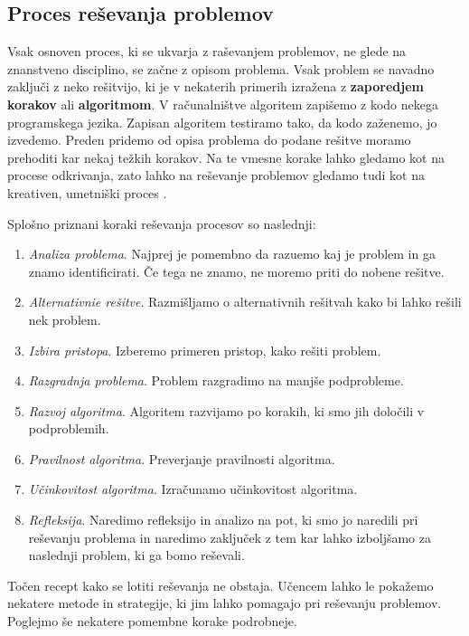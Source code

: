 \subsection{Proces reševanja problemov}
\label{sec:proces_reševanja_problemov}

Vsak osnoven proces, ki se ukvarja z raševanjem problemov, ne glede na
znanstveno disciplino, se začne z opisom problema. Vsak problem se
navadno zaključi z neko rešitvijo, ki je v nekaterih primerih izražena
z \textbf{zaporedjem korakov} ali \textbf{algoritmom}. V računalništve
algoritem zapišemo z kodo nekega programskega jezika. Zapisan
algoritem testiramo tako, da kodo zaženemo, jo izvedemo. Preden
pridemo od opisa problema do podane rešitve moramo prehoditi kar nekaj
težkih korakov. Na te vmesne korake lahko gledamo kot na procese
odkrivanja, zato lahko na reševanje problemov gledamo tudi kot na
kreativen, umetniški proces \cite{guideTCS}.

Splošno priznani koraki reševanja procesov so naslednji:

\begin{enumerate}
\tightlist
\item \emph{Analiza problema}. Najprej je pomembno da razuemo kaj je
  problem in ga znamo identificirati. Če tega ne znamo, ne moremo
  priti do nobene rešitve.
\item \emph{Alternativnie rešitve}. Razmišljamo o alternativnih
  rešitvah kako bi lahko rešili nek problem.
\item \emph{Izbira pristopa}. Izberemo primeren pristop, kako rešiti problem.
\item \emph{Razgradnja problema}. Problem razgradimo na manjše podprobleme.
\item \emph{Razvoj algoritma}. Algoritem razvijamo po korakih, ki smo
  jih določili v podproblemih.
\item \emph{Pravilnost algoritma}. Preverjanje pravilnosti algoritma.
\item \emph{Učinkovitost algoritma}. Izračunamo učinkovitost algoritma.
\item \emph{Refleksija}. Naredimo refleksijo in analizo na pot, ki smo
  jo naredili pri reševanju problema in naredimo zaključek z tem kar
  lahko izboljšamo za naslednji problem, ki ga bomo reševali.
\end{enumerate}

Točen recept kako se lotiti reševanja ne obstaja. Učencem lahko le
pokažemo nekatere metode in strategije, ki jim lahko pomagajo pri
reševanju problemov. Poglejmo še nekatere pomembne korake podrobneje.

